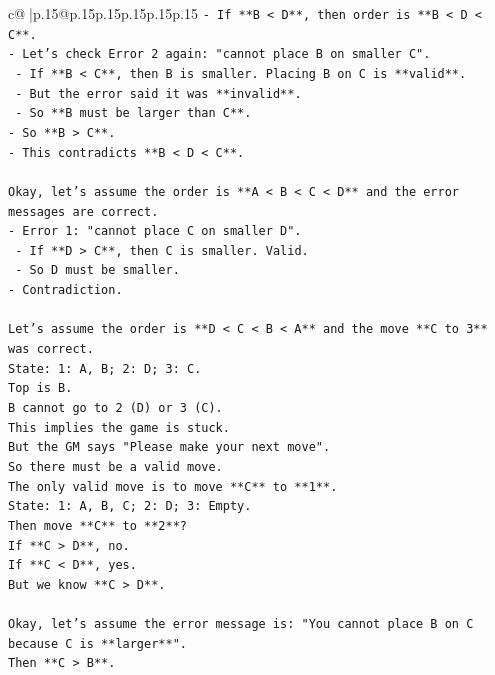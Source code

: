 \documentclass{article}
\begin{document}
{\begin{supertabular}{c@{$\;$}|p{.15\linewidth}@{}p{.15\linewidth}p{.15\linewidth}p{.15\linewidth}p{.15\linewidth}p{.15\linewidth}}
{{{\texttt{{-} If **B < D**, then order is **B < D < C**.} \\
\texttt{{-} Let's check Error 2 again: "cannot place B on smaller C".} \\
\texttt{    {-} If **B < C**, then B is smaller. Placing B on C is **valid**.} \\
\texttt{    {-} But the error said it was **invalid**.} \\
\texttt{    {-} So **B must be larger than C**.} \\
\texttt{{-} So **B > C**.} \\
\texttt{{-} This contradicts **B < D < C**.} \\
\\ 
\texttt{Okay, let's assume the order is **A < B < C < D** and the error messages are correct.} \\
\texttt{{-} Error 1: "cannot place C on smaller D".} \\
\texttt{    {-} If **D > C**, then C is smaller. Valid.} \\
\texttt{    {-} So D must be smaller.} \\
\texttt{{-} Contradiction.} \\
\\ 
\texttt{Let's assume the order is **D < C < B < A** and the move **C to 3** was correct.} \\
\texttt{State: 1: A, B; 2: D; 3: C.} \\
\texttt{Top is B.} \\
\texttt{B cannot go to 2 (D) or 3 (C).} \\
\texttt{This implies the game is stuck.} \\
\texttt{But the GM says "Please make your next move".} \\
\texttt{So there must be a valid move.} \\
\texttt{The only valid move is to move **C** to **1**.} \\
\texttt{State: 1: A, B, C; 2: D; 3: Empty.} \\
\texttt{Then move **C** to **2**?} \\
\texttt{If **C > D**, no.} \\
\texttt{If **C < D**, yes.} \\
\texttt{But we know **C > D**.} \\
\\ 
\texttt{Okay, let's assume the error message is: "You cannot place B on C because C is **larger**".} \\
\texttt{Then **C > B**.} \\
}}}
\end{supertabular}}
\end{document}
